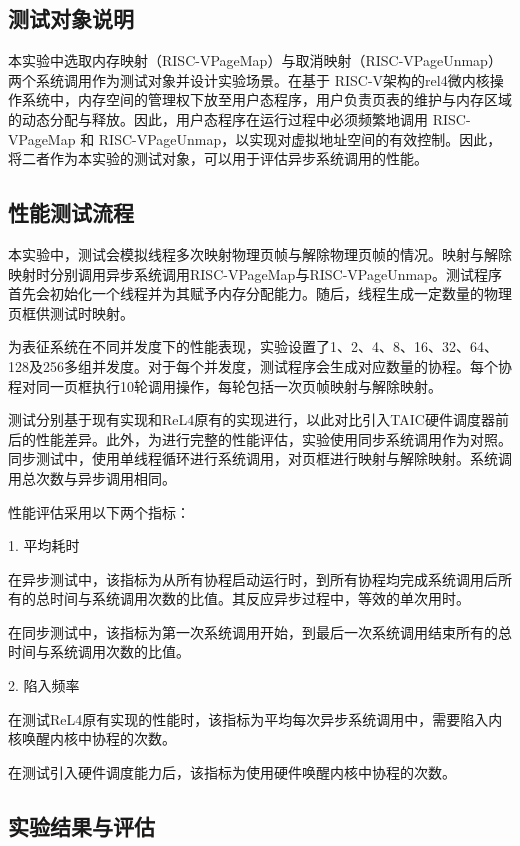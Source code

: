 \subsection{测试对象说明}

本实验中选取内存映射（RISC-VPageMap）与取消映射（RISC-VPageUnmap）两个系统调用作为测试对象并设计实验场景。在基于 RISC-V架构的rel4微内核操作系统中，内存空间的管理权下放至用户态程序，用户负责页表的维护与内存区域的动态分配与释放。因此，用户态程序在运行过程中必须频繁地调用 RISC-VPageMap 和 RISC-VPageUnmap，以实现对虚拟地址空间的有效控制。因此，将二者作为本实验的测试对象，可以用于评估异步系统调用的性能。

\subsection{性能测试流程}

本实验中，测试会模拟线程多次映射物理页帧与解除物理页帧的情况。映射与解除映射时分别调用异步系统调用RISC-VPageMap与RISC-VPageUnmap。测试程序首先会初始化一个线程并为其赋予内存分配能力。随后，线程生成一定数量的物理页框供测试时映射。

为表征系统在不同并发度下的性能表现，实验设置了1、2、4、8、16、32、64、128及256多组并发度。对于每个并发度，测试程序会生成对应数量的协程。每个协程对同一页框执行10轮调用操作，每轮包括一次页帧映射与解除映射。

测试分别基于现有实现和ReL4原有的实现进行，以此对比引入TAIC硬件调度器前后的性能差异。此外，为进行完整的性能评估，实验使用同步系统调用作为对照。同步测试中，使用单线程循环进行系统调用，对页框进行映射与解除映射。系统调用总次数与异步调用相同。

性能评估采用以下两个指标：

1. 平均耗时

在异步测试中，该指标为从所有协程启动运行时，到所有协程均完成系统调用后所有的总时间与系统调用次数的比值。其反应异步过程中，等效的单次用时。

在同步测试中，该指标为第一次系统调用开始，到最后一次系统调用结束所有的总时间与系统调用次数的比值。

2. 陷入频率

在测试ReL4原有实现的性能时，该指标为平均每次异步系统调用中，需要陷入内核唤醒内核中协程的次数。

在测试引入硬件调度能力后，该指标为使用硬件唤醒内核中协程的次数。


\subsection{实验结果与评估}

